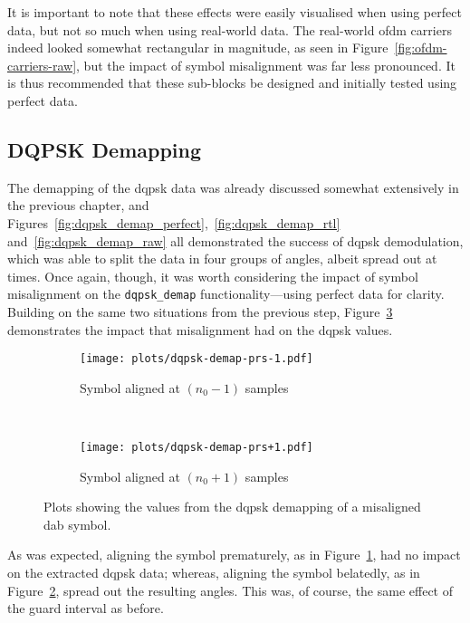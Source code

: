 \documentclass[class=report,11pt,crop=false]{standalone}
\begin{document}
It is important to note that these effects were easily visualised when using perfect data, but not so much when using real-world data. The real-world \gls{ofdm} carriers indeed looked somewhat rectangular in magnitude, as seen in Figure~\ref{fig:ofdm-carriers-raw}, but the impact of symbol misalignment was far less pronounced. It is thus recommended that these sub-blocks be designed and initially tested using perfect data.
  
\subsection{DQPSK Demapping}
The demapping of the \gls{dqpsk} data was already discussed somewhat extensively in the previous chapter, and Figures~\ref{fig:dqpsk_demap_perfect},~\ref{fig:dqpsk_demap_rtl} and~\ref{fig:dqpsk_demap_raw} all demonstrated the success of \gls{dqpsk} demodulation, which was able to split the data in four groups of angles, albeit spread out at times. Once again, though, it was worth considering the impact of symbol misalignment on the \texttt{dqpsk\_demap} functionality---using perfect data for clarity. Building on the same two situations from the previous step, Figure~\ref{fig:dqpsk-demap-prs} demonstrates the impact that misalignment had on the \gls{dqpsk} values.

\begin{figure}[htbp]
  \centering
  \captionsetup{type=figure}
  \begin{subfigure}[t]{0.45\textwidth}
    \centering
    \captionsetup{type=figure}
    \texttt{[image: plots/dqpsk-demap-prs-1.pdf]}
    \caption{Symbol aligned at \((n_0 - 1)\) samples}
    \label{fig:dqpsk-demap-prs-1}
  \end{subfigure}%
  ~ 
  \begin{subfigure}[t]{0.45\textwidth}
    \centering
    \captionsetup{type=figure}
    \texttt{[image: plots/dqpsk-demap-prs+1.pdf]}
    \caption{Symbol aligned at \((n_0 + 1)\) samples}
    \label{fig:dqpsk-demap-prs+1}
  \end{subfigure}
  \caption{Plots showing the values from the \gls{dqpsk} demapping of a misaligned \gls{dab} symbol.}
  \label{fig:dqpsk-demap-prs}
\end{figure}

As was expected, aligning the symbol prematurely, as in Figure~\ref{fig:dqpsk-demap-prs-1}, had no impact on the extracted \gls{dqpsk} data; whereas, aligning the symbol belatedly, as in Figure~\ref{fig:dqpsk-demap-prs+1}, spread out the resulting angles. This was, of course, the same effect of the guard interval as before.
\end{document}
